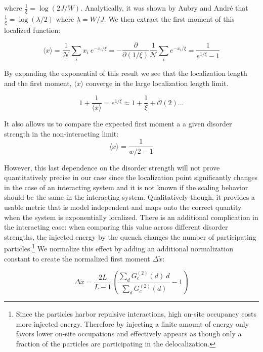 where $\frac{1}{\xi}=\log{(2 J/W)}$. Analytically, it was shown by Aubry and Andr\'e that $\frac{1}{\xi}=\log{(\lambda/2)}$ where $\lambda = W/J$\cite{Aubry1980}. We then extract the first moment of this localized function:

\[
\langle x \rangle = \frac{1}{\mathcal{N}} \sum_i x_i~e^{-x_i /\xi}= - \frac{\partial}{\partial (1/\xi)}  \frac{1}{\mathcal{N}} \sum_i e^{-x_i /\xi} = \frac{1}{e^{1/\xi} - 1} 
\]

By expanding the exponential of this result we see that the localization length and the first moment, $\langle x \rangle$ converge  in the large localization length limit. 

\[
1+\frac{1}{\langle x \rangle} = e^{1/\xi} \approx 1 + \frac{1}{\xi} + \mathcal{O}(2) ...
\]


It also allows us to compare the expected first moment a a given disorder strength in the non-interacting limit:
\[
\langle x \rangle = \frac{1}{w/2 - 1}
\]

However, this last dependence on the disorder strength will not prove quantitatively precise in our case since the localization point significantly changes in the case of an interacting system and it is not known if the scaling behavior should be the same in the interacting system. Qualitatively though, it provides a usable metric that is model independent and maps onto the correct quantity when the system is exponentially localized. There is an additional complication in the interacting case: when comparing this value across different disorder strengths, the injected energy by the quench changes the number of participating particles.\footnote{Since the particles harbor repulsive interactions, high on-site occupancy costs more injected energy. Therefore by injecting a finite amount of energy only favors lower on-site occupations and effectively appears as though only a fraction of the particles are participating in the delocalization.} We normalize this effect by adding an additional normalization constant to create the normalized first moment $\Delta \tilde{x}$:

\begin{equation}
\label{eqn:normg2}
\Delta \tilde{x} = \frac{2 L}{L-1} \left (\frac{\sum_d G^{(2)}_c(d)~d }{\sum_d G^{(2)}_c(d)} -1 \right )
\end{equation}

